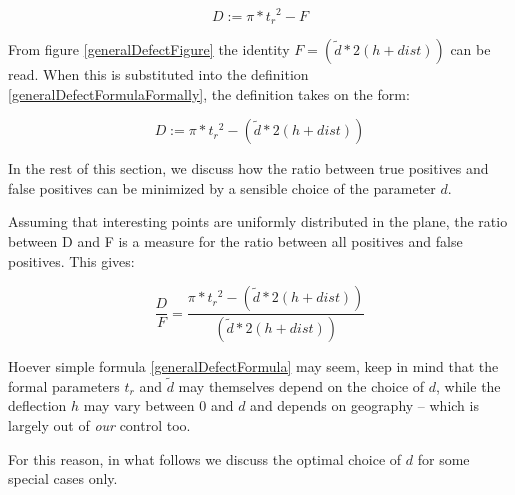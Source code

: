 
\begin{equation}
\label{generalDefectFormulaFormally}
	D:=\pi*{t_r}^2-F
\end{equation}

From figure \ref{generalDefectFigure} the identity $F=(\tilde{d}*2(h+dist))$ can be read.
When this is substituted into the definition \ref{generalDefectFormulaFormally},
the definition takes on the form:

\begin{equation}
\label{generalDefectFormula}
        D:=\pi*{t_r}^2-(\tilde{d}*2(h+dist))
\end{equation}

In the rest of this section, we discuss how  the ratio between true positives and false positives 
can be minimized by a sensible choice of the parameter $d$. 

Assuming that interesting points are uniformly distributed in the plane, the
ratio between D and F is a measure for the ratio between all positives and false positives.
This gives:


\begin{equation}
\label{defectRatioFormula}
        \frac{D}{F}=\frac{\pi*{t_r}^2-(\tilde{d}*2(h+dist))}{(\tilde{d}*2(h+dist))}
\end{equation}


Hoever simple formula \ref{generalDefectFormula} may seem, keep in mind that the formal 
parameters $t_r$ and $\tilde{d}$ may themselves depend on the choice of $d$, while the 
deflection $h$ may vary between 0 and $d$ and depends on geography -- which  is largely out 
of \emph{our} control too.

For this reason, in what follows we discuss the optimal choice of $d$ for some 
special cases only.













